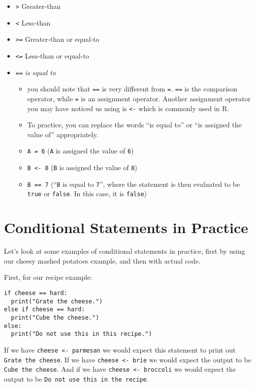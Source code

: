 \documentclass[
]{book}
\providecommand{\tightlist}{%
  \setlength{\itemsep}{0pt}\setlength{\parskip}{0pt}}
\begin{document}
\begin{itemize}
\tightlist
\item
  \texttt{\textgreater{}} Greater-than
\item
  \texttt{\textless{}} Less-than
\item
  \texttt{\textgreater{}=} Greater-than or equal-to
\item
  \texttt{\textless{}=} Less-than or equal-to
\item
  \texttt{==} \emph{is equal to}

  \begin{itemize}
  \tightlist
  \item
    you should note that \texttt{==} is very different from \texttt{=}. \texttt{==} is the comparison operator, while \texttt{=} is an assignment operator. Another assignment operator you may have noticed us using is \texttt{\textless{}-} which is commonly used in R.
  \item
    To practice, you can replace the words ``is equal to'' or ``is assigned the value of'' appropriately.
  \item
    \texttt{A\ =\ 6} (\texttt{A} is assigned the value of \texttt{6})
  \item
    \texttt{B\ \textless{}-\ 8} (\texttt{B} is assigned the value of \texttt{8})
  \item
    \texttt{B\ ==\ 7} (``\texttt{B} is equal to \texttt{7}'', where the statement is then evaluated to be \texttt{true} or \texttt{false}. In this case, it is \texttt{false})
  \end{itemize}
\end{itemize}

\section{Conditional Statements in Practice}\label{conditional-statements-in-practice}

Let's look at some examples of conditional statements in practice, first by using our cheesy mashed potatoes example, and then with actual code.

First, for our recipe example:

\begin{verbatim}
if cheese == hard:
  print("Grate the cheese.")
else if cheese == hard:
  print("Cube the cheese.")
else:
  print("Do not use this in this recipe.")
\end{verbatim}

If we have \texttt{cheese\ \textless{}-\ parmesan} we would expect this statement to print out \texttt{Grate\ the\ cheese}. If we have \texttt{cheese\ \textless{}-\ brie} we would expect the output to be \texttt{Cube\ the\ cheese}. And if we have \texttt{cheese\ \textless{}-\ broccoli} we would expect the output to be \texttt{Do\ not\ use\ this\ in\ the\ recipe}.
\end{document}
